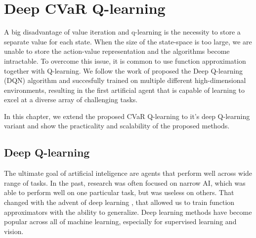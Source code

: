 \chapter{Deep CVaR Q-learning}\label{ch:dqn}

A big disadvantage of value iteration and q-learning is the necessity to store a separate value for each state. When the size of the state-space is too large, we are unable to store the action-value representation and the algorithms become intractable. To overcome this issue, it is common to use function approximation together with Q-learning. We follow the work of \citet{mnih2015human} proposed the Deep Q-learning (DQN) algorithm and succesfully trained on multiple different high-dimensional environments, resulting in the first artificial agent that is capable of learning to excel at a diverse array of challenging tasks.

In this chapter, we extend the proposed CVaR Q-learning to it's deep Q-learning variant and show the practicality and scalability of the proposed methods.

\section{Deep Q-learning}
The ultimate goal of artificial inteligence are agents that perform well across wide range of tasks. In the past, research was often focused on narrow AI, which was able to perform well on one particular task, but was useless on others. That changed with the advent of deep learning \cite{neco}, that allowed us to train function approximators with the ability to generalize. Deep learning methods have become popular across all of machine learning, especially for supervised learning and vision.


